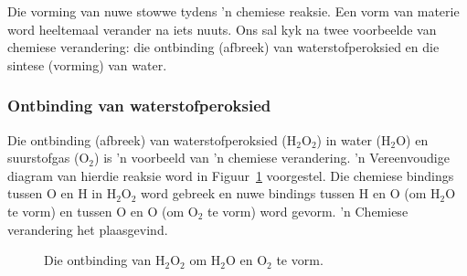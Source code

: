   { \label{m38709*meaningfhsst!!!underscore!!!id107}
     Die vorming van nuwe stowwe tydens 'n chemiese reaksie. Een vorm van materie word heeltemaal verander na iets nuuts.
       } 
Ons sal kyk na twee voorbeelde van chemiese verandering: die ontbinding (afbreek) van waterstofperoksied en die sintese
(vorming) van water. \\
\subsubsection*{Ontbinding van waterstofperoksied}
      \label{m38709*id62788}Die ontbinding (afbreek) van waterstofperoksied ($\text{H}_{2}\text{O}_{2}$) in water ($\text{H}_{2}\text{O}$) en suurstofgas ($\text{O}_{2}$) is 'n voorbeeld van 'n chemiese verandering. 'n Vereenvoudige diagram van hierdie reaksie word in  Figuur~\ref{fig:chemical change:decomposition} voorgestel. Die chemiese bindings tussen $\text{O}$ en $\text{H}$ in $\text{H}_{2}\text{O}_{2}$ word gebreek en nuwe bindings tussen $\text{H}$ en $\text{O}$ (om $\text{H}_{2}\text{O}$ te vorm) en tussen $\text{O}$ en $\text{O}$ (om $\text{O}_{2}$ te vorm) word gevorm. 'n Chemiese verandering het plaasgevind.\par 
    \setcounter{subfigure}{0}
\begin{figure}[H]
\begin{center}
\end{center}
\caption{Die ontbinding van $\text{H}_{2}\text{O}_{2}$ om $\text{H}_{2}\text{O}$ en $\text{O}_{2}$ te vorm.}
\label{fig:chemical change:decomposition}
\end{figure}     
